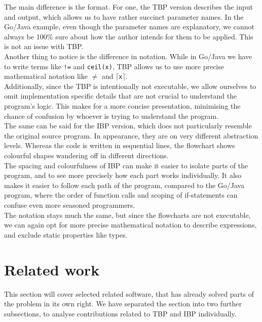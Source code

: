 The main difference is the format. For one, the TBP version describes the input and output, which allows us to have rather succinct parameter names. In the Go/Java example, even though the parameter names are explanatory, we cannot always be 100\% sure about how the author intends for them to be applied. This is not an issue with TBP. \\

Another thing to notice is the difference in notation. While in Go/Java we have to write terms like \texttt{!=} and \texttt{ceil(x)}, TBP allows us to use more precise mathematical notation like \texttt{$\neq$} and \texttt{$\lceil$x$\rceil$}. \\

Additionally, since the TBP is intentionally not executable, we allow ourselves to omit implementation specific details that are not crucial to understand the program's logic. This makes for a more concise presentation, minimising the chance of confusion by whoever is trying to understand the program. \\

The same can be said for the IBP version, which does not particularly resemble the original source program. In appearance, they are on very different abstraction levels. Whereas the code is written in sequential lines, the flowchart shows colourful shapes wandering off in different directions. \\

The spacing and colourfulness of IBP can make it easier to isolate parts of the program, and to see more precisely how each part works individually. It also makes it easier to follow each path of the program, compared to the Go/Java program, where the order of function calls and scoping of if-statements can confuse even more seasoned programmers. \\

The notation stays much the same, but since the flowcharts are not executable, we can again opt for more precise mathematical notation to describe expressions, and exclude static properties like types.

\section{Related work}

This section will cover selected related software, that has already solved parts of the problem in its own right. We have separated the section into two further subsections, to analyse contributions related to TBP and IBP individually.

